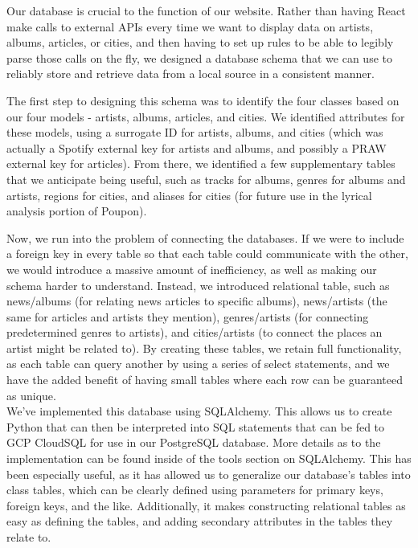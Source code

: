 \documentclass{scrartcl}
\begin{document}
Our database is crucial to the function of our website. Rather than having React make calls to external APIs every time we want to display data on artists, albums, articles, or cities, and then having to set up rules to be able to legibly parse those calls on the fly, we designed a database schema that we can use to reliably store and retrieve data from a local source in a consistent manner.

The first step to designing this schema was to identify the four classes based on our four models - artists, albums, articles, and cities. We identified attributes for these models, using a surrogate ID for artists, albums, and cities (which was actually a Spotify external key for artists and albums, and possibly a PRAW external key for articles). From there, we identified a few supplementary tables that we anticipate being useful, such as tracks for albums, genres for albums and artists, regions for cities, and aliases for cities (for future use in the lyrical analysis portion of Poupon).

Now, we run into the problem of connecting the databases. If we were to include a foreign key in every table so that each table could communicate with the other, we would introduce a massive amount of inefficiency, as well as making our schema harder to understand. Instead, we introduced relational table, such as news/albums (for relating news articles to specific albums), news/artists (the same for articles and artists they mention), genres/artists (for connecting predetermined genres to artists), and cities/artists (to connect the places an artist might be related to). By creating these tables, we retain full functionality, as each table can query another by using a series of select statements, and we have the added benefit of having small tables where each row can be guaranteed as unique.\\

We've implemented this database using SQLAlchemy. This allows us to create Python that can then be interpreted into SQL statements that can be fed to GCP CloudSQL for use in our PostgreSQL database. More details as to the implementation can be found inside of the tools section on SQLAlchemy. This has been especially useful, as it has allowed us to generalize our database's tables into class tables, which can be clearly defined using parameters for primary keys, foreign keys, and the like. Additionally, it makes constructing relational tables as easy as defining the tables, and adding secondary attributes in the tables they relate to.
\end{document}
